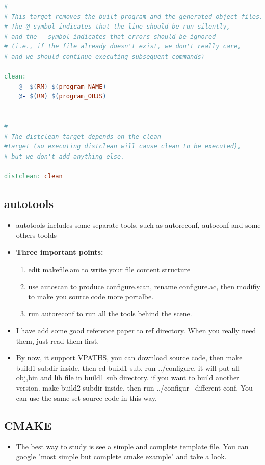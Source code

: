 \documentclass[a4paper,12pt,twoside]{book}
\begin{document}
\begin{itemize}
\begin{lstlisting}[frame=single,  basicstyle=\small, language=make]
#
# This target removes the built program and the generated object files. 
# The @ symbol indicates that the line should be run silently, 
# and the - symbol indicates that errors should be ignored 
# (i.e., if the file already doesn't exist, we don't really care, 
# and we should continue executing subsequent commands)

clean:
    @- $(RM) $(program_NAME)
    @- $(RM) $(program_OBJS)


#
# The distclean target depends on the clean
#target (so executing distclean will cause clean to be executed), 
# but we don't add anything else.

distclean: clean
\end{lstlisting}


\end{itemize}
\subsection{autotools}
\begin{itemize}
		\item autotools includes some separate tools, such as autoreconf, autoconf and some others toolds
		\item \textbf{Three important points:}
				\begin{enumerate}
						\item edit makefile.am to write your file content structure
						\item use autoscan to produce configure.scan, rename configure.ac, then modifiy to make you source code more portalbe. 
						\item run autoreconf to run all the tools behind the scene.
				\end{enumerate}
		\item I have add some good reference paper to ref directory. When you really need them, just read them first. 

		\item By now, it support VPATHS, you can download source code, then make build1 subdir inside, then cd build1 sub, run ../configure, it will put all obj,bin and lib file in build1 sub directory. if you want to build another version. make build2 subdir inside, then run ../configur --different-conf. You can use the same set source code in this way. 
\end{itemize}
\subsection{CMAKE}
\begin{itemize}
		\item The best way to study is see a simple and complete template file. You can google "most simple but complete cmake example" and take a look.  

\end{itemize}
\end{document}
